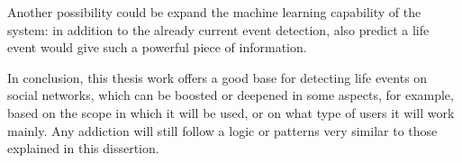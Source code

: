 Another possibility could be expand the machine learning capability of the system: in addition to the already current event detection, also predict a life event would give such a powerful piece of information.

In conclusion, this thesis work offers a good base for detecting life events on social networks, which can be boosted or deepened in some aspects, for example, based on the scope in which it will be used, or on what type of users it will work mainly. Any addiction will still follow a logic or patterns very similar to those explained in this dissertion.